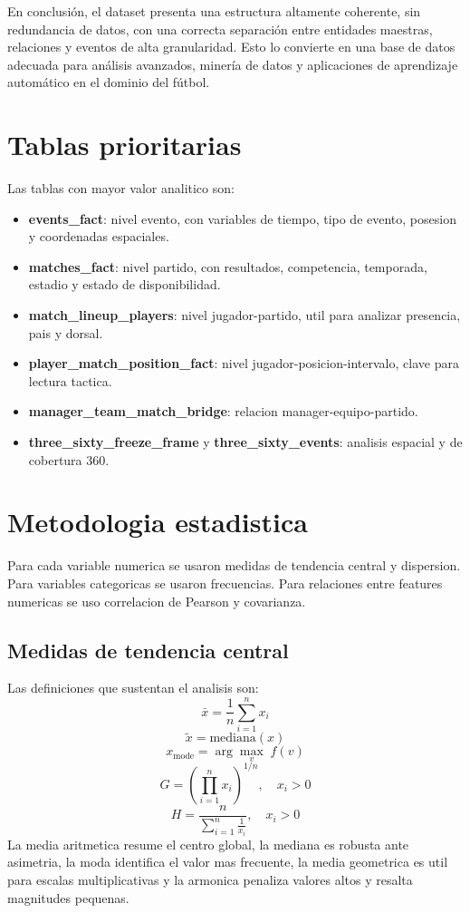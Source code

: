 \documentclass[12pt,a4paper]{article}
\begin{document}
En conclusión, el dataset presenta una estructura altamente coherente, sin redundancia de datos, con una correcta separación entre entidades maestras, relaciones y eventos de alta granularidad. Esto lo convierte en una base de datos adecuada para análisis avanzados, minería de datos y aplicaciones de aprendizaje automático en el dominio del fútbol.



\section{Tablas prioritarias}
Las tablas con mayor valor analitico son:
\begin{itemize}
  \item \textbf{events\_fact}: nivel evento, con variables de tiempo, tipo de evento, posesion y coordenadas espaciales.
  \item \textbf{matches\_fact}: nivel partido, con resultados, competencia, temporada, estadio y estado de disponibilidad.
  \item \textbf{match\_lineup\_players}: nivel jugador-partido, util para analizar presencia, pais y dorsal.
  \item \textbf{player\_match\_position\_fact}: nivel jugador-posicion-intervalo, clave para lectura tactica.
  \item \textbf{manager\_team\_match\_bridge}: relacion manager-equipo-partido.
  \item \textbf{three\_sixty\_freeze\_frame} y \textbf{three\_sixty\_events}: analisis espacial y de cobertura 360.
\end{itemize}

\section{Metodologia estadistica}
Para cada variable numerica se usaron medidas de tendencia central y dispersion. Para variables categoricas se usaron frecuencias. Para relaciones entre features numericas se uso correlacion de Pearson y covarianza.

\subsection{Medidas de tendencia central}
Las definiciones que sustentan el analisis son:
\[
\bar{x} = \frac{1}{n}\sum_{i=1}^{n} x_i
\]
\[
\tilde{x} = \text{mediana}(x)
\]
\[
x_{\mathrm{mode}} = \arg\max_v \; f(v)
\]
\[
G = \left(\prod_{i=1}^{n} x_i\right)^{1/n}, \quad x_i > 0
\]
\[
H = \frac{n}{\sum_{i=1}^{n} \frac{1}{x_i}}, \quad x_i > 0
\]
La media aritmetica resume el centro global, la mediana es robusta ante asimetria, la moda identifica el valor mas frecuente, la media geometrica es util para escalas multiplicativas y la armonica penaliza valores altos y resalta magnitudes pequenas.
\end{document}
